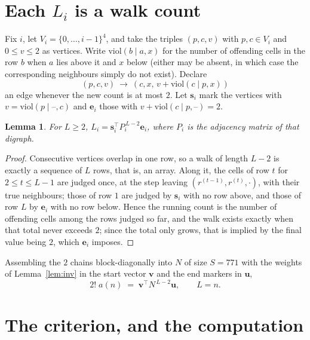 \documentclass[11pt,a4paper]{article}
\theoremstyle{plain}
\newtheorem{lemma}[theorem]{Lemma}
\theoremstyle{definition}
\begin{document}
\section{Each $L_i$ is a walk count}

Fix $i$, let $V_i=\{0,\dots,i-1\}^{4}$, and take the triples $(p,c,v)$ with
$p,c\in V_i$ and $0\le v\le2$ as vertices. Write $\mathrm{viol}(b\mid a,x)$ for the number
of offending cells in the row $b$ when $a$ lies above it and $x$ below (either may be
absent, in which case the corresponding neighbours simply do not exist). Declare
\[
(p,c,v)\ \longrightarrow\ (c,x,\,v+\mathrm{viol}(c\mid p,x))
\]
an edge whenever the new count is at most $2$. Let $\mathbf{s}_i$ mark the vertices with
$v=\mathrm{viol}(p\mid\text{--},c)$ and $\mathbf{e}_i$ those with
$v+\mathrm{viol}(c\mid p,\text{--})=2$.

\begin{lemma}\label{lem:walk}
For $L\ge2$, $L_i=\mathbf{s}_i^{\!\top}P_i^{\,L-2}\mathbf{e}_i$, where $P_i$ is the
adjacency matrix of that digraph.
\end{lemma}

\begin{proof}
Consecutive vertices overlap in one row, so a walk of length $L-2$ is exactly a sequence
of $L$ rows, that is, an array. Along it, the cells of row $t$ for $2\le t\le L-1$ are
judged once, at the step leaving $(r^{(t-1)},r^{(t)},\cdot)$, with their true neighbours;
those of row $1$ are judged by $\mathbf{s}_i$ with no row above, and those of row
$L$ by $\mathbf{e}_i$ with no row below. Hence the running count is the number of
offending cells among the rows judged so far, and the walk exists exactly when that total
never exceeds $2$; since the total only grows, that is implied by the final value being
$2$, which $\mathbf{e}_i$ imposes.
\end{proof}

Assembling the $2$ chains block-diagonally into $N$ of size $S=771$ with the weights of
Lemma~\ref{lem:inv} in the start vector $\mathbf{v}$ and the end markers in
$\mathbf{u}$,
\begin{equation}\label{eq:walk2}
2!\;a(n)\;=\;\mathbf{v}^{\!\top}N^{\,L-2}\mathbf{u},\qquad L=n .
\end{equation}

\section{The criterion, and the computation}
\end{document}
